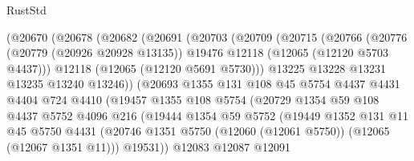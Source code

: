 \begin{lexlean}{RustStd}
\begin{coremodule}
                  (@20670
                    (@20678
                      (@20682
                        (@20691
                          (@20703
                            (@20709
                              (@20715
                                (@20766
                                  (@20776
                                    (@20779 (@20926 @20928 @13135))
                                    @19476
                                    @12118
                                    (@12065 (@12120 @5703 @4437)))
                                  @12118
                                  (@12065 (@12120 @5691 @5730)))
                                @13225
                                @13228
                                @13231
                                @13235
                                @13240
                                @13246))
                            (@20693
                              @1355
                              @131
                              @108
                              @45
                              @5754
                              @4437
                              @4431
                              @4404
                              @724
                              @4410
                              (@19457
                                @1355
                                @108
                                @5754
                                (@20729
                                  @1354
                                  @59
                                  @108
                                  @4437
                                  @5752
                                  @4096
                                  @216
                                  (@19444
                                    @1354
                                    @59
                                    @5752
                                    (@19449
                                      @1352
                                      @131
                                      @11
                                      @45
                                      @5750
                                      @4431
                                      (@20746
                                        @1351
                                        @5750
                                        (@12060 (@12061 @5750))
                                        (@12065 (@12067 @1351 @11)))
                                      @19531))
                                  @12083
                                  @12087
                                  @12091

\end{coremodule}
\end{lexlean}
